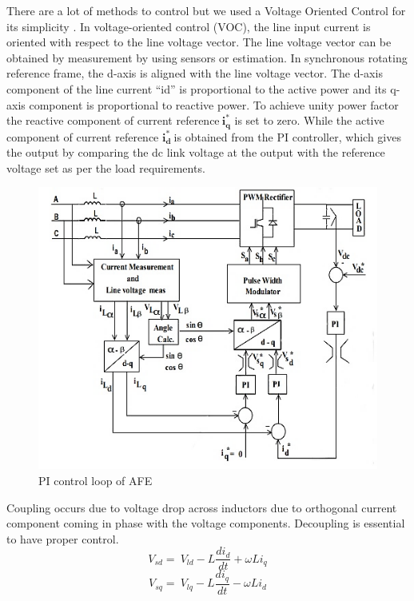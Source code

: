 \documentclass[12pt,a4paper]{book}
\begin{document}
There are a lot of methods to control but we used a Voltage Oriented Control for its simplicity \cite{pid2015}.
In voltage-oriented control (VOC), the line input current is oriented with respect to the line voltage vector. The line voltage vector can be obtained by measurement by using sensors or estimation. In synchronous rotating reference frame, the d-axis is aligned with the line voltage vector. The d-axis component of the line current ``id'' is proportional to the active power and its q-axis component is proportional to reactive power. To achieve unity power factor the reactive component of current reference\(\ \mathbf{i}_{\mathbf{q}}^{\mathbf{*}}\) is set to zero. While the active component of current reference \(\mathbf{i}_{\mathbf{d}}^{\mathbf{*}}\mathbf{\ }\)is obtained from the PI controller, which gives the output by comparing the dc link voltage at the output with the reference voltage set as per the load requirements.

\begin{figure}[h]
  \centering
  \includegraphics[width=15cm]{image13.png}
  \caption{PI control loop of AFE}
  \label{fig:image13}
\end{figure}

Coupling occurs due to voltage drop across inductors due to orthogonal current component coming in phase with the voltage components. Decoupling is essential to have proper control.
\begin{equation}
  V_{sd}=\ V_{ld}-L\frac{{di}_d}{dt}+\omega Li_q
  \label{equation:eq4}
\end{equation}
\begin{equation}
  V_{sq}=\ V_{lq}-L\frac{{di}_q}{dt}-\omega Li_d
  \label{equation:eq5}
\end{equation}
\end{document}

